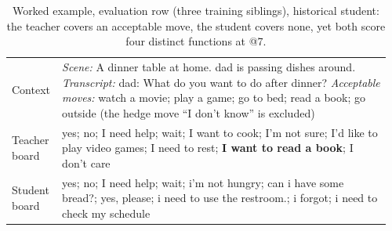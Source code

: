 \begin{table}[t]
\centering\footnotesize\renewcommand{\arraystretch}{0.9}\setlength{\belowcaptionskip}{3pt}
\caption{Worked example, evaluation row  (three training siblings), historical student: the teacher covers an acceptable move, the student covers none, yet both score four distinct functions at @7.}
\label{tab:example}
\begin{tabular}{@{}p{0.115\linewidth}p{0.85\linewidth}@{}}
\toprule
Context & \emph{Scene:} A dinner table at home. dad is passing dishes around. \emph{Transcript:} dad: What do you want to do after dinner? \emph{Acceptable moves:} watch a movie; play a game; go to bed; read a book; go outside (the hedge move ``I don't know'' is excluded)\\
Teacher board & yes; no; I need help; wait; I want to cook; I'm not sure; I'd like to play video games; I need to rest; \textbf{I want to read a book}; I don't care\\
Student board & yes; no; I need help; wait; i'm not hungry; can i have some bread?; yes, please; i need to use the restroom.; i forgot; i need to check my schedule\\
\bottomrule
\end{tabular}
\end{table}

